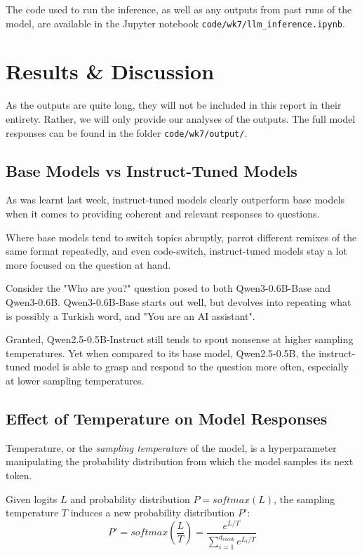 \documentclass{article} %
\begin{document}
The code used to run the inference, as well as any outputs
from past runs of the model,
are available in the Jupyter notebook
\texttt{code/wk7/llm\_inference.ipynb}.

\section{Results \& Discussion}
As the outputs are quite long, they will not be included in this report
in their entirety. Rather, we will only provide our analyses of the outputs.
The full model responses can be found in the folder
\texttt{code/wk7/output/}. 

\subsection{Base Models vs Instruct-Tuned Models}
As was learnt last week, instruct-tuned models clearly outperform base models
when it comes to providing coherent and relevant responses to questions.

Where base models tend to switch topics abruptly, parrot
different remixes of the same format repeatedly, and even code-switch,
instruct-tuned models stay a lot more focused on the question at hand.

Consider the "Who are you?" question posed to both Qwen3-0.6B-Base and Qwen3-0.6B.
Qwen3-0.6B-Base starts out well, but devolves into repeating what is possibly a Turkish word,
and "You are an AI assistant".

Granted, Qwen2.5-0.5B-Instruct still tends to spout nonsense
at higher sampling temperatures. Yet when compared to its base model,
Qwen2.5-0.5B, the instruct-tuned model is able to grasp and respond to
the question more often, especially at lower sampling temperatures.

\subsection{Effect of Temperature on Model Responses}
Temperature, or the \textit{sampling temperature} of 
the model, is a hyperparameter manipulating the probability distribution
from which the model samples its next token.

Given logits $L$ and probability distribution $P = softmax(L)$, the sampling temperature $T$ 
induces a new probability distribution $P'$:
\begin{equation}
    P' = softmax\left(\frac{L}{T}\right) = \frac{e^{L/T}}{\sum_{i=1}^{d_{vocab}} e^{L_i/T}}
\end{equation}
\end{document}
